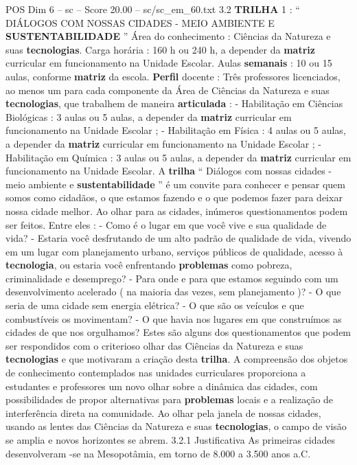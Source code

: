 \begin{textsample}{POS Dim 6 – sc – Score 20.00 – sc/sc\_em\_60.txt}  \label{ex:f6_pos_018}
3.2 \textbf{TRILHA} 1 : “ DIÁLOGOS COM NOSSAS CIDADES - MEIO AMBIENTE E \textbf{SUSTENTABILIDADE} ” Área do conhecimento : Ciências da Natureza e suas \textbf{tecnologias}.
Carga horária : 160 h ou 240 h, a depender da \textbf{matriz} curricular em funcionamento na Unidade Escolar.
Aulas \textbf{semanais} : 10 ou 15 aulas, conforme \textbf{matriz} da escola. \textbf{Perfil} docente : Três professores licenciados, ao menos um para cada componente da Área de Ciências da Natureza e suas \textbf{tecnologias}, que trabalhem de maneira \textbf{articulada} : - Habilitação em Ciências Biológicas : 3 aulas ou 5 aulas, a depender da \textbf{matriz} curricular em funcionamento na Unidade Escolar ; - Habilitação em Física : 4 aulas ou 5 aulas, a depender da \textbf{matriz} curricular em funcionamento na Unidade Escolar ; - Habilitação em Química : 3 aulas ou 5 aulas, a depender da \textbf{matriz} curricular em funcionamento na Unidade Escolar.
A \textbf{trilha} “ Diálogos com nossas cidades - meio ambiente e \textbf{sustentabilidade} ” é um convite para conhecer e pensar quem somos como cidadãos, o que estamos fazendo e o que podemos fazer para deixar nossa cidade melhor.
Ao olhar para as cidades, inúmeros questionamentos podem ser feitos.
Entre eles : - Como é o lugar em que você vive e sua qualidade de vida? - Estaria você desfrutando de um alto padrão de qualidade de vida, vivendo em um lugar com planejamento urbano, serviços públicos de qualidade, acesso à \textbf{tecnologia}, ou estaria você enfrentando \textbf{problemas} como pobreza, criminalidade e desemprego? - Para onde e para que estamos seguindo com um desenvolvimento acelerado ( na maioria das vezes, sem planejamento )? - O que seria de uma cidade sem energia elétrica? - O que são os veículos e que combustíveis os movimentam? - O que havia nos lugares em que construímos as cidades de que nos orgulhamos?
Estes são alguns dos questionamentos que podem ser respondidos com o criterioso olhar das Ciências da Natureza e suas \textbf{tecnologias} e que motivaram a criação desta \textbf{trilha}.
A compreensão dos objetos de conhecimento contemplados nas unidades curriculares proporciona a estudantes e professores um novo olhar sobre a dinâmica das cidades, com possibilidades de propor alternativas para \textbf{problemas} locais e a realização de interferência direta na comunidade.
Ao olhar pela janela de nossas cidades, usando as lentes das Ciências da Natureza e suas \textbf{tecnologias}, o campo de visão se amplia e novos horizontes se abrem. 3.2.1 Justificativa As primeiras cidades desenvolveram -se na Mesopotâmia, em torno de 8.000 a 3.500 anos a.C.

\end{textsample}

